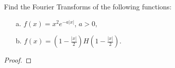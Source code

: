 \begin{problem}{1}
  Find the Fourier Transforms of the following functions:
  \begin{enumerate}
    \item[a.] $f(x) = x^2 e^{-a|x|}$, $a > 0$,
    \item[b.] $\displaystyle f(x) = \left(1 - \frac{|x|}{2}\right)H\left(1 - \frac{|x|}{2}\right)$.
  \end{enumerate}
\end{problem}

\begin{proof}
\end{proof}
\newpage
